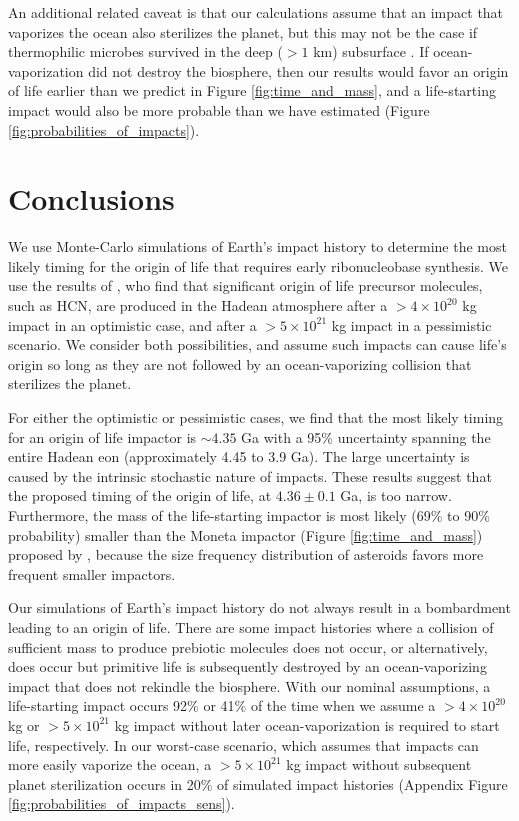 \documentclass[manuscript]{aastex63}
\begin{document}
An additional related caveat is that our calculations assume that an impact that vaporizes the ocean also sterilizes the planet, but this may not be the case if thermophilic microbes survived in the deep ($> 1$ km) subsurface \citep{Sleep_1998}. If ocean-vaporization did not destroy the biosphere, then our results would favor an origin of life earlier than we predict in Figure \ref{fig:time_and_mass}, and a life-starting impact would also be more probable than we have estimated (Figure \ref{fig:probabilities_of_impacts}).

\section{Conclusions}

We use Monte-Carlo simulations of Earth's impact history to determine the most likely timing for the origin of life that requires early ribonucleobase synthesis. We use the results of \citet{Wogan_2023}, who find that significant origin of life precursor molecules, such as HCN, are produced in the Hadean atmosphere after a $> 4 \times 10^{20}$ kg impact in an optimistic case, and after a $> 5 \times 10^{21}$ kg impact in a pessimistic scenario. We consider both possibilities, and assume such impacts can cause life's origin so long as they are not followed by an ocean-vaporizing collision that sterilizes the planet.

For either the optimistic or pessimistic cases, we find that the most likely timing for an origin of life impactor is $\sim 4.35$ Ga with a 95\% uncertainty spanning the entire Hadean eon (approximately 4.45 to 3.9 Ga). The large uncertainty is caused by the intrinsic stochastic nature of impacts. These results suggest that the \citet{Benner_2020} proposed timing of the origin of life, at $4.36 \pm 0.1$ Ga, is too narrow. Furthermore, the mass of the life-starting impactor is most likely (69\% to 90\% probability) smaller than the Moneta impactor (Figure \ref{fig:time_and_mass}) proposed by \citet{Benner_2020}, because the size frequency distribution of asteroids favors more frequent smaller impactors.

Our simulations of Earth's impact history do not always result in a bombardment leading to an origin of life. There are some impact histories where a collision of sufficient mass to produce prebiotic molecules does not occur, or alternatively, does occur but primitive life is subsequently destroyed by an ocean-vaporizing impact that does not rekindle the biosphere. With our nominal assumptions, a life-starting impact occurs 92\% or 41\% of the time when we assume a $> 4 \times 10^{20}$ kg or $> 5 \times 10^{21}$ kg impact without later ocean-vaporization is required to start life, respectively. In our worst-case scenario, which assumes that impacts can more easily vaporize the ocean, a $> 5 \times 10^{21}$ kg impact without subsequent planet sterilization occurs in 20\% of simulated impact histories (Appendix Figure \ref{fig:probabilities_of_impacts_sens}).
\end{document}
